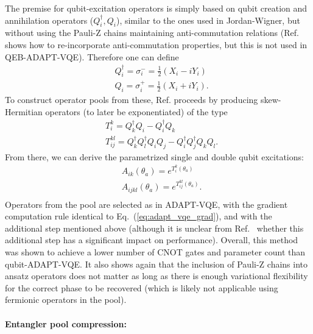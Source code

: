 The premise for qubit-excitation operators is simply based on qubit creation and annihilation operators ($Q_i^{\dagger}, Q_i$), similar to the ones used in Jordan-Wigner, but without using the Pauli-Z chains maintaining anti-commutation relations (Ref. \cite{Yordanov2020_QE} shows how to re-incorporate anti-commutation properties, but this is not used in QEB-ADAPT-VQE). Therefore one can define
\begin{align}
    &Q_i^{\dagger} = \sigma_i^- = \frac{1}{2} (X_i - iY_i) \nonumber \\
    &Q_i = \sigma_i^+ = \frac{1}{2} (X_i + iY_i).
\end{align}
To construct operator pools from these, Ref. \cite{Yordanov2020_QE} proceeds by producing skew-Hermitian  operators (to later be exponentiated) of the type
\begin{align}
    &T_i^k= Q_k^{\dagger}Q_i - Q_i^{\dagger}Q_k \nonumber \\
    &T_{ij}^{kl}= Q_k^{\dagger}Q_l^{\dagger}Q_iQ_j - Q_i^{\dagger}Q_j^{\dagger}Q_kQ_l.
\end{align}
From there, we can derive the parametrized single and double qubit excitations:
\begin{align}
    &A_{ik}(\theta_a) = e^{T_i^k(\theta_a)}\nonumber \\
    &A_{ijkl}(\theta_a) = e^{T_{ij}^{kl}(\theta_a)}. \\
\end{align}
Operators from the pool are selected as in ADAPT-VQE, with the gradient computation rule identical to Eq.~(\ref{eq:adapt_vqe_grad}), and with the additional step mentioned above (although it is unclear from Ref.~\cite{Yordanov2021} whether this additional step has a significant impact on performance).
Overall, this method was shown to achieve a lower number of CNOT gates and parameter count than qubit-ADAPT-VQE. It also shows again that the inclusion of Pauli-Z chains into ansatz operators does not matter as long as there is enough variational flexibility for the correct phase to be recovered (which is likely not applicable using fermionic operators in the pool).

\paragraph{Entangler pool compression:} \label{sec:MI_assisted_VQE}

